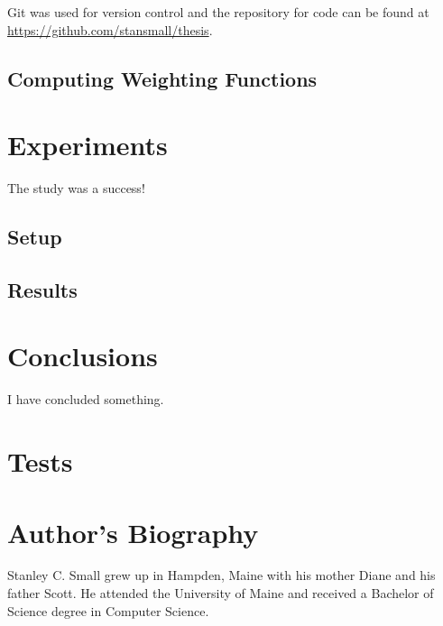 \documentclass{article}
\begin{document}
Git was used for version control and the repository for code can be found at \url{https://github.com/stansmall/thesis}.

		\subsection{Computing Weighting Functions}

	\newpage
	\section{Experiments}
The study was a success!

		\subsection{Setup}
		\subsection{Results}
	\newpage
	\section{Conclusions}
I have concluded something. 
	\nocite{*}
	\newpage
	\printbibliography

	\newpage
	\appendix

	\section{Tests}

	\newpage
	\section*{Author's Biography}
Stanley C. Small grew up in Hampden, Maine with his mother Diane and his father Scott. He attended the University of Maine and received a Bachelor of Science degree in Computer Science. 
\end{document}
